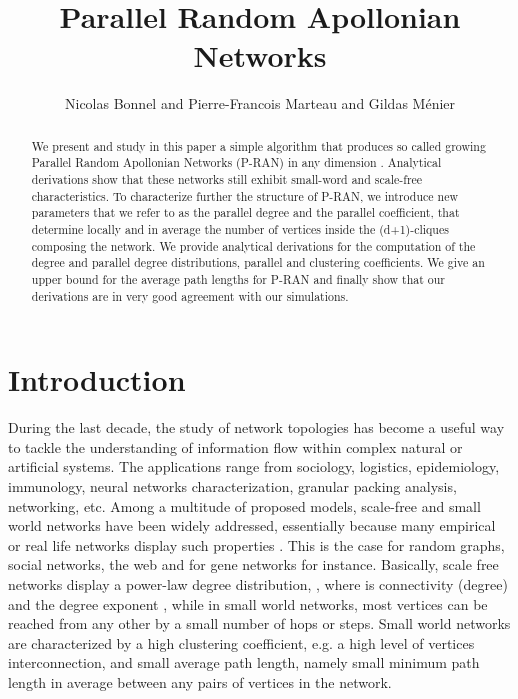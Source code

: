 \documentclass[11pt]{iopart}
\begin{document}
\title{Parallel Random Apollonian Networks}

\author{Nicolas Bonnel and Pierre-Francois Marteau and Gildas M\'enier}

\address{VALORIA, Universit\'e de Bretagne Sud, Universit\'e Europ\'eenne de Bretagne, Campus de Tohannic, 56 000 Vannes, France}
\begin{abstract}
We present and study in this paper a simple algorithm that produces  so called growing Parallel Random Apollonian Networks (P-RAN) in any dimension . Analytical derivations show that these networks still exhibit small-word and scale-free characteristics. To characterize further the structure of P-RAN, we introduce new parameters that we refer to as the parallel degree and the parallel coefficient, that determine locally and in average the number of vertices inside the (d+1)-cliques composing the network. We provide analytical derivations for the computation of the degree and parallel degree distributions, parallel and clustering coefficients. We give an upper bound for the average path lengths for P-RAN and finally show that our derivations are in very good agreement with our simulations.
\end{abstract}

\maketitle

\section{Introduction}

During the last decade, the study of network topologies has become a useful way to tackle the understanding of information flow within complex natural or artificial systems. The applications range from sociology, logistics, epidemiology, immunology, neural networks characterization, granular packing analysis, networking, etc.  Among a multitude of proposed models, scale-free and small world networks have been widely addressed, essentially because many empirical or real life networks display such properties \cite{citeulike:298144,citeulike:696940}. This is the case for random graphs, social networks, the web and for gene networks for instance. Basically, scale free networks display a power-law degree distribution, , where  is connectivity (degree) and  the degree exponent \cite{barabasi-1999}, while in small world networks, most vertices can be reached from any other by a small number of hops or steps.  Small world networks are characterized by a high clustering coefficient, e.g. a high level of vertices interconnection, and small average path length, namely small minimum path length in average between any pairs of vertices in the network.
\end{document}
